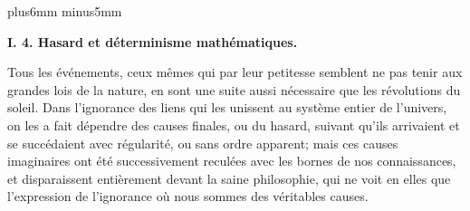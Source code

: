 \vskip7mm plus6mm minus5mm
 
{\bf I. 4. Hasard et d\'eterminisme math\'ematiques.} 
\medskip
{\cit Tous les \'ev\'enements, ceux m\^emes qui par leur petitesse semblent 
ne pas tenir aux grandes lois de la nature, en sont une suite aussi
n\'ecessaire que les r\'evolutions du soleil. Dans l'ignorance des liens 
qui les unissent au syst\`eme entier de l'univers, on les a fait d\'ependre 
des causes finales, ou du hasard, suivant qu'ils arrivaient et se 
succ\'edaient avec r\'egularit\'e, ou sans ordre apparent; mais ces causes
imaginaires ont \'et\'e successivement recul\'ees avec les bornes de nos
connaissances, et disparaissent enti\`erement devant la saine philosophie, 
qui ne voit en elles que l'expression de l'ignorance o\`u nous sommes des
v\'eritables causes. \par}
\smallskip
{}
\medskip

